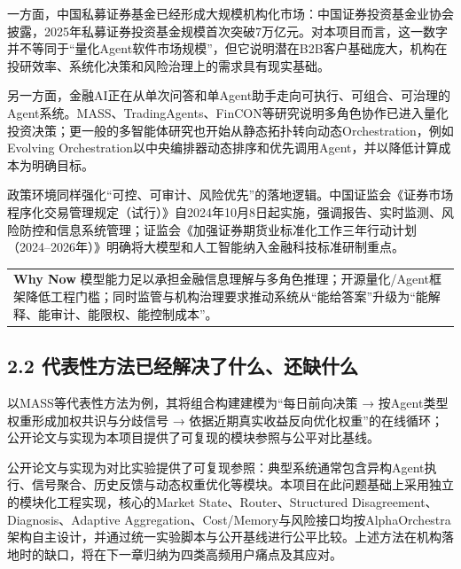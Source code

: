 \documentclass[12pt,a4paper]{ctexart}
\begin{document}
一方面，中国私募证券基金已经形成大规模机构化市场：中国证券投资基金业协会披露，2025年私募证券投资基金规模首次突破7万亿元。对本项目而言，这一数字并不等同于``量化Agent软件市场规模''，但它说明潜在B2B客户基础庞大，机构在投研效率、系统化决策和风险治理上的需求具有现实基础。

另一方面，金融AI正在从单次问答和单Agent助手走向可执行、可组合、可治理的Agent系统。MASS、TradingAgents、FinCON等研究说明多角色协作已进入量化投资决策；更一般的多智能体研究也开始从静态拓扑转向动态Orchestration，例如Evolving
Orchestration以中央编排器动态排序和优先调用Agent，并以降低计算成本为明确目标。

政策环境同样强化``可控、可审计、风险优先''的落地逻辑。中国证监会《证券市场程序化交易管理规定（试行）》自2024年10月8日起实施，强调报告、实时监测、风险防控和信息系统管理；证监会《加强证券期货业标准化工作三年行动计划（2024--2026年）》明确将大模型和人工智能纳入金融科技标准研制重点。

\begin{longtable}[]{@{}
  >{\raggedright\arraybackslash}p{}@{}}
\toprule\noalign{}
\endhead
\bottomrule\noalign{}
\endlastfoot
\textbf{Why Now}
模型能力足以承担金融信息理解与多角色推理；开源量化/Agent框架降低工程门槛；同时监管与机构治理要求推动系统从``能给答案''升级为``能解释、能审计、能限权、能控制成本''。 \\
\end{longtable}

\subsection{\texorpdfstring{\textbf{2.2
代表性方法已经解决了什么、还缺什么}}{2.2 代表性方法已经解决了什么、还缺什么}}\label{ux4ee3ux8868ux6027ux65b9ux6cd5ux5df2ux7ecfux89e3ux51b3ux4e86ux4ec0ux4e48ux8fd8ux7f3aux4ec0ux4e48}

以MASS等代表性方法为例，其将组合构建建模为``每日前向决策 →
按Agent类型权重形成加权共识与分歧信号 →
依据近期真实收益反向优化权重''的在线循环；公开论文与实现为本项目提供了可复现的模块参照与公平对比基线。

公开论文与实现为对比实验提供了可复现参照：典型系统通常包含异构Agent执行、信号聚合、历史反馈与动态权重优化等模块。本项目在此问题基础上采用独立的模块化工程实现，核心的Market
State、Router、Structured Disagreement、Diagnosis、Adaptive
Aggregation、Cost/Memory与风险接口均按AlphaOrchestra架构自主设计，并通过统一实验脚本与公开基线进行公平比较。上述方法在机构落地时的缺口，将在下一章归纳为四类高频用户痛点及其应对。
\end{document}
